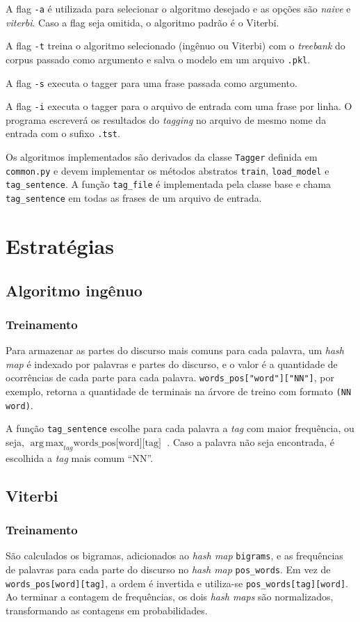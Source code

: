 \documentclass[12pt, a4paper]{article}
\newcommand{\code}[1]{{\lstinline{#1}}}
\DeclareMathOperator*{\argmax}{arg\,max}
\begin{document}
A flag \code{-a} é utilizada para selecionar o algoritmo desejado e as opções
são \emph{naive} e \emph{viterbi}. Caso a flag seja omitida, o algoritmo
padrão é o Viterbi.

A flag \code{-t} treina o algoritmo selecionado (ingênuo ou Viterbi) com o
\emph{treebank} do corpus passado como argumento e salva o modelo em um arquivo \code{.pkl}.

A flag \code{-s} executa o tagger para uma frase passada como argumento.

A flag \code{-i} executa o tagger para o arquivo de entrada com uma frase por
linha. O programa escreverá os resultados do \emph{tagging} no arquivo de mesmo
nome da entrada com o sufixo \code{.tst}.

Os algoritmos implementados são derivados da classe \code{Tagger} definida em
\code{common.py} e devem implementar os métodos abstratos \code{train},
\code{load_model} e \code{tag_sentence}. A função \code{tag_file} é implementada
pela classe base e chama \code{tag_sentence} em todas as frases de
um arquivo de entrada.

\section{Estratégias}
\subsection{Algoritmo ingênuo}
\subsubsection{Treinamento}
Para armazenar as partes do discurso mais comuns para cada palavra, um
\emph{hash map} é indexado por palavras e partes do discurso, e o valor é a
quantidade de ocorrências de cada parte para cada palavra.
\code{words_pos["word"]["NN"]}, por exemplo, retorna a quantidade de terminais
na árvore de treino com formato \code{(NN word)}.

A função \code{tag_sentence} escolhe para cada palavra a \emph{tag}
com maior frequência, ou seja, $ \argmax_{tag} \text{words\_pos[word][tag]} $ .
Caso a palavra não seja encontrada, é escolhida a \emph{tag} mais comum ``NN''.

\subsection{Viterbi}
\subsubsection{Treinamento}
São calculados os bigramas, adicionados ao \emph{hash map} \code{bigrams}, e as
frequências de palavras para cada parte do discurso no \emph{hash map}
\code{pos_words}. Em vez de \code{words_pos[word][tag]}, a ordem é invertida e
utiliza-se \code{pos_words[tag][word]}. Ao terminar a contagem de frequências,
os dois \emph{hash maps} são normalizados, transformando as contagens em
probabilidades.
\end{document}
